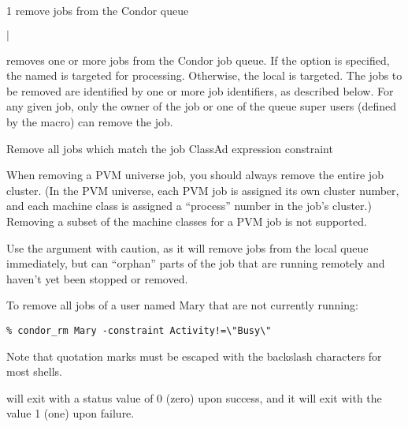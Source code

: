 \begin{ManPage}{\label{man-condor-rm}}{1}
{remove jobs from the Condor queue}
\Synopsis {}
\ToolArgsBase

\ToolDebugOption
\ToolLocate
\ToolJobs
$|$  \Dots

\ToolDebugOption
\ToolLocate
\ToolAll


\Description

 removes one or more jobs from the Condor job queue.  
If the  option is specified, the named  is targeted
for processing.  
Otherwise, the local  is targeted.
The jobs to be removed are identified by one or more job identifiers, as
described below.
For any given job, only the owner of the job or one of the queue super users
(defined by the  macro) can remove the job.

\begin{Options}
	\ToolArgsBaseDesc
	\ToolLocateDesc
        \ToolDebugDesc
	 {Remove all jobs which match
	                the job ClassAd expression constraint}
\end{Options}

\GenRem

When removing a PVM universe job, you should always remove the entire
job cluster.  (In the PVM universe, each PVM job is assigned its own
cluster number, and each machine class is assigned a ``process''
number in the job's cluster.)  Removing a subset of the machine
classes for a PVM job is not supported.

Use the  argument with caution, as it will remove jobs
from the local queue immediately, but can ``orphan'' parts of the job
that are running remotely and haven't yet been stopped or removed.

\Examples
To remove all jobs of a user named Mary that are not currently running:
\footnotesize
\begin{verbatim}
% condor_rm Mary -constraint Activity!=\"Busy\"
\end{verbatim}
\normalsize
Note that quotation marks must be escaped with the backslash characters
for most shells.

\ExitStatus

 will exit with a status value of 0 (zero) upon success,
and it will exit with the value 1 (one) upon failure.

\end{ManPage}
